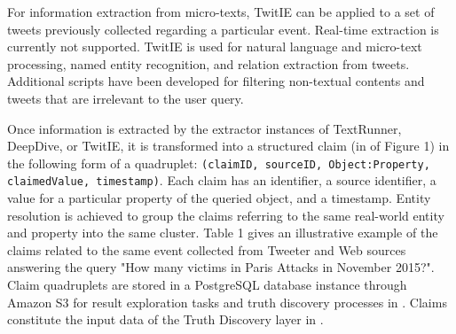 For information extraction from micro-texts, TwitIE  can be applied to a set of tweets previously collected regarding a particular event. Real-time extraction is currently not supported. TwitIE is used for natural language and micro-text processing, named entity recognition, and relation extraction from tweets. Additional scripts have been developed for filtering non-textual contents and  tweets that are irrelevant to the user query.

Once information is extracted by the extractor instances of TextRunner, DeepDive, %
or TwitIE, 
it is transformed into a  structured  claim (in  of Figure 1) in the following form of a quadruplet: 
{\small\texttt{(\textsf{claimID}, \textsf{sourceID}, \textsf{Object:Property}, \textsf{claimedValue}, \textsf{timestamp})}}. Each claim has an identifier, a source identifier, a value for a particular property of the queried object, and a timestamp. %
Entity resolution is achieved to group the claims referring to the same real-world entity and  property into the same cluster. Table 1 gives an illustrative example of the claims related to the same event collected from Tweeter and Web sources answering the query  "How many victims in Paris Attacks in November 2015?". Claim quadruplets are stored in  a PostgreSQL database instance through Amazon S3 for result exploration tasks and truth discovery processes in . 
Claims constitute the input data of the Truth Discovery layer  in . 


